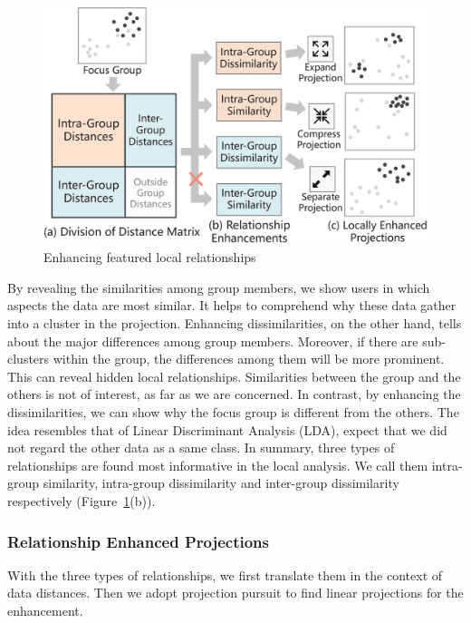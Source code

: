 \begin{figure}[htbp]
\centering
\includegraphics[width=1\linewidth]{images/enhancement1.eps}
  \caption{Enhancing featured local relationships}
\label{fig:local_relationships}
  \end{figure}

By revealing the similarities among group members, we show users in which aspects the data are most similar. It helps to comprehend why these data gather into a cluster in the projection. Enhancing dissimilarities, on the other hand, tells about the major differences among group members. Moreover, if there are sub-clusters within the group, the differences among them will be more prominent. This can reveal hidden local relationships.  Similarities between the group and the others is not of interest, as far as we are concerned. In contrast, by enhancing the dissimilarities, we can show why the focus group is different from the others. The idea resembles that of Linear Discriminant Analysis (LDA), expect that we did not regard the other data as a same class. In summary, three types of relationships are found most informative in the local analysis. We call them intra-group similarity, intra-group dissimilarity and inter-group dissimilarity respectively (Figure~\ref{fig:local_relationships}(b)).

\subsubsection{Relationship Enhanced Projections}
\label{subsubsection:relationship_enhancement}
With the three types of relationships, we first translate them in the context of data distances. Then we adopt projection pursuit to find linear projections for the enhancement.

